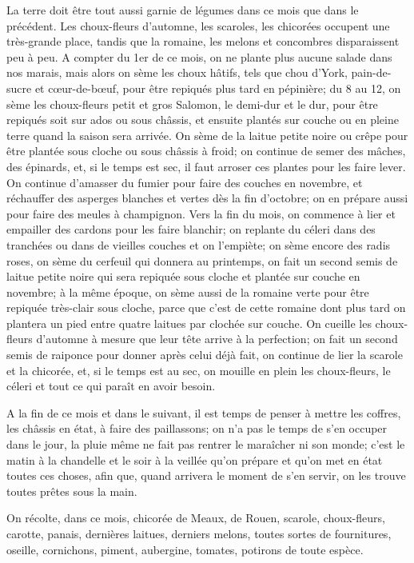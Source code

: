 \documentclass[10pt,a4paper]{book}
\begin{document}
La terre doit être tout aussi garnie de légumes dans ce mois que dans le précédent. Les choux-fleurs d'automne, les scaroles, les chicorées occupent une très-grande place, tandis que la romaine, les melons et concombres disparaissent peu à peu. A compter du 1er de ce mois, on ne plante plus aucune salade dans nos marais, mais alors on sème les choux hâtifs, tels que chou d'York, pain-de-sucre et cœur-de-bœuf, pour être repiqués plus tard en pépinière; du 8 au 12, on sème les choux-fleurs petit et gros Salomon, le demi-dur et le dur, pour être repiqués soit sur ados ou sous châssis, et ensuite plantés sur couche ou en pleine terre quand la saison sera arrivée. On sème de la laitue petite noire ou crêpe pour être plantée sous cloche ou sous châssis à froid; on continue de semer des mâches, des épinards, et, si le temps est sec, il faut arroser ces plantes pour les faire lever. On continue d'amasser du fumier pour faire des couches en novembre, et réchauffer des asperges blanches et vertes dès la fin d'octobre; on en prépare aussi pour faire des meules à champignon. Vers la fin du mois, on commence à lier et empailler des cardons pour les faire blanchir; on replante du céleri dans des tranchées ou dans de vieilles couches et on l'empiète; on sème encore des radis roses, on sème du cerfeuil qui donnera au printemps, on fait un second semis de laitue petite noire qui sera repiquée sous cloche et plantée sur couche en novembre; à la même époque, on sème aussi de la romaine verte pour être repiquée très-clair sous cloche, parce que c'est de cette romaine dont plus tard on plantera un pied entre quatre laitues par clochée sur couche. On cueille les choux-fleurs d'automne à mesure que leur tête arrive à la perfection; on fait un second semis de raiponce pour donner après celui déjà fait, on continue de lier la scarole et la chicorée, et, si le temps est au sec, on mouille en plein les choux-fleurs, le céleri et tout ce qui paraît en avoir besoin.

A la fin de ce mois et dans le suivant, il est temps de penser à mettre les coffres, les châssis en état, à faire des paillassons; on n'a pas le temps de s'en occuper dans le jour, la pluie même ne fait pas rentrer le maraîcher ni son monde; c'est le matin à la chandelle et le soir à la veillée qu'on prépare et qu'on met en état toutes ces choses, afin que, quand arrivera le moment de s'en servir, on les trouve toutes prêtes sous la main.

On récolte, dans ce mois, chicorée de Meaux, de Rouen, scarole, choux-fleurs, carotte, panais, dernières laitues, derniers melons, toutes sortes de fournitures, oseille, cornichons, piment, aubergine, tomates, potirons de toute espèce.
\end{document}
